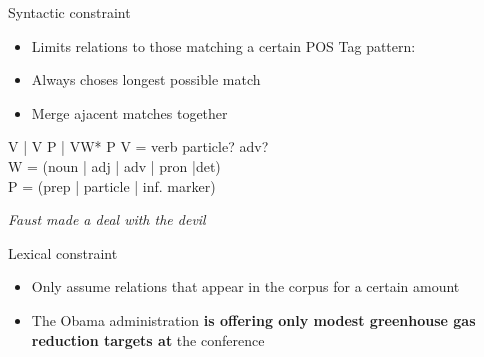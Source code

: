 \documentclass[11pt]{beamer}
\begin{document}
		
		\begin{frame}{Syntactic constraint}
			\begin{center}
				\begin{itemize}
				\item Limits relations to those matching a certain POS Tag pattern:
				\item Always choses longest possible match
				\item Merge ajacent matches together
				\end{itemize}
				\begin{block}{V | V P | VW* P}
					V = verb particle? adv?\\
					W = (noun | adj | adv | pron |det)\\
					P = (prep | particle | inf. marker)
				\end{block}
				\textit{Faust made a deal with the devil}
			\end{center}
		\end{frame}
		\begin{frame}{Lexical constraint}
			\begin{center}
				\begin{itemize}
				\item Only assume relations that appear in the corpus for a certain amount
				\item The Obama administration \textbf{is offering only modest greenhouse gas reduction targets at} the conference
				\end{itemize}
			\end{center}
		\end{frame}
\end{document}
